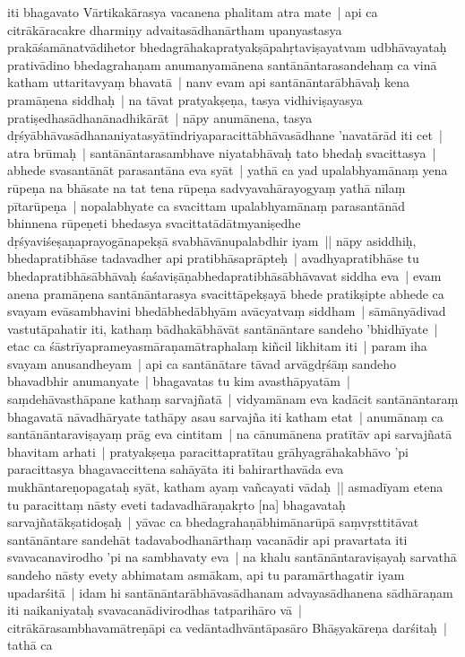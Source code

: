 \documentclass[article,12pt,a4paper]{memoir}%
\newcounter{parCount}
\begin{document}
	  \pstart \leavevmode%
	iti bhagavato Vārtikakārasya vacanena phalitam atra mate | api ca citrākāracakre dharmiṇy advaitasādhanārtham upanyastasya prakāśamānatvādihetor bhedagrāhakapratyakṣāpahṛtaviṣayatvam udbhāvayataḥ prativādino bhedagrahaṇam anumanyamānena santānāntarasandehaṃ ca vinā katham uttaritavyaṃ bhavatā | \label{thakur75-148.21} nanv evam api santānāntarābhāvaḥ kena pramāṇena siddhaḥ | na tāvat pratyakṣeṇa, tasya vidhiviṣayasya pratiṣedhasādhanānadhikārāt | nāpy anumānena, tasya dṛśyābhāvasādhananiyatasyātīndriyaparacittābhāvasādhane 'navatārād iti cet | atra brūmaḥ | santānāntarasambhave niyatabhāvaḥ tato bhedaḥ svacittasya | abhede svasantānāt parasantāna eva syāt | yathā ca yad upalabhyamānaṃ yena rūpeṇa na bhāsate na tat tena rūpeṇa sadvyavahārayogyaṃ yathā nīlaṃ pītarūpeṇa | nopalabhyate ca svacittam upalabhyamānaṃ parasantānād bhinnena rūpeṇeti bhedasya svacittatādātmyaniṣedhe dṛśyaviśeṣaṇaprayogānapekṣā svabhāvānupalabdhir iyam || \label{thakur75-148.28} nāpy asiddhiḥ, bhedapratibhāse tadavadher api pratibhāsaprāpteḥ | avadhyapratibhāse tu bhedapratibhāsābhāvaḥ śaśaviṣāṇabhedapratibhāsābhāvavat siddha eva | evam anena pramāṇena santānāntarasya svacittāpekṣayā bhede pratikṣipte abhede ca svayam evāsambhavini bhedābhedābhyām avācyatvaṃ siddham | sāmānyādivad vastutāpahatir iti, kathaṃ bādhakābhāvāt santānāntare sandeho 'bhidhīyate | etac ca śāstrīyaprameyasmāraṇamātraphalaṃ kiñcil likhitam iti | param iha svayam anusandheyam | \label{thakur75-149.3} api ca santānātare tāvad arvāgdṛśāṃ sandeho bhavadbhir anumanyate | bhagavatas tu kim avasthāpyatām | saṃdehāvasthāpane kathaṃ sarvajñatā | vidyamānam eva kadācit santānāntaraṃ bhagavatā nāvadhāryate tathāpy asau sarvajña iti katham etat | anumānaṃ ca santānāntaraviṣayaṃ prāg eva cintitam | na cānumānena pratītāv api sarvajñatā bhavitam arhati | pratyakṣeṇa paracittapratītau grāhyagrāhakabhāvo 'pi paracittasya bhagavaccittena sahāyāta iti bahirarthavāda eva mukhāntareṇopagataḥ syāt, katham ayaṃ vañcayati vādaḥ || \label{thakur75-149.9} asmadīyam etena tu paracittaṃ nāsty eveti tadavadhāraṇakṛto [na] bhagavataḥ sarvajñatākṣatidoṣaḥ | yāvac ca bhedagrahaṇābhimānarūpā saṃvṛsttitāvat santānāntare sandehāt tadavabodhanārthaṃ vacanādir api pravartata iti svavacanavirodho 'pi na sambhavaty eva | na khalu santānāntaraviṣayaḥ sarvathā sandeho nāsty evety abhimatam asmākam, api tu paramārthagatir iyam upadarśitā | idam hi santānāntarābhāvasādhanam advayasādhanena sādhāraṇam iti naikaniyataḥ svavacanādivirodhas tatparihāro vā | citrākārasambhavamātreṇāpi ca vedāntadhvāntāpasāro Bhāṣyakāreṇa darśitaḥ | tathā ca
	{}
	\pend%
      
\end{document}
